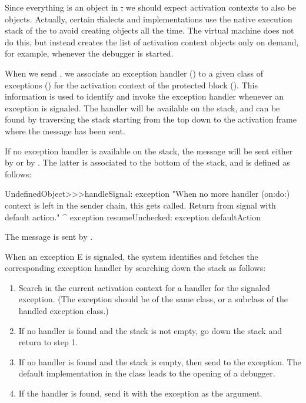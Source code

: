 \documentclass[a4paper,10pt,twoside]{book}
\begin{document}
Since everything is an object in \st, we should expect activation contexts to also be objects.
Actually, certain \st dialects and implementations use the native  execution stack of the  to avoid creating objects all the time.
The \pharo virtual machine does not do this, but instead creates the list of activation context objects only on demand, for example, whenever the debugger is started.

When we send , we associate an exception handler () to a given class of exceptions () for the activation context of the protected block ().
This information is used to identify and invoke the exception handler whenever an exception is signaled. The handler will be available on the stack, and can be found by traversing the stack starting from the top down to the activation frame where the  message has been sent.

If no exception handler is available on the stack, the message  will be sent either by  or by . The latter is associated to the bottom of the stack, and is defined as follows:

\begin{code}
UndefinedObject>>>handleSignal: exception
	"When no more handler (on:do:) context is left in the sender chain, this gets called.  Return from signal with default action."
	^ exception resumeUnchecked: exception defaultAction
\end{code}

The message  is sent by . 

When an exception E is signaled, the system identifies and fetches the corresponding exception handler by searching down the stack as follows:

\begin{enumerate}

\item Search in the current activation context for a handler for the signaled exception.
(The exception should be of the same class, or a subclass of the handled exception class.)

\item If no handler is found and the stack is not empty, go down the stack and return to step 1.

\item If no handler is found and the stack is empty, then send  to the exception. The default implementation in the  class leads to the opening of a debugger.

\item If the handler is found, send it  with the exception as the argument.

\end{enumerate}
\end{document}

